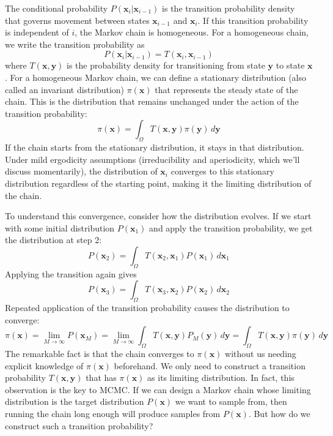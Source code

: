 The conditional probability $P(\mathbf{x}_i|\mathbf{x}_{i-1})$ is the transition probability density that governs movement between states $\mathbf{x}_{i-1}$ and $\mathbf{x}_i$. If this transition probability is independent of $i$, the Markov chain is homogeneous. For a homogeneous chain, we write the transition probability as
\begin{equation}
    P(\mathbf{x}_i|\mathbf{x}_{i-1}) = T(\mathbf{x}_i, \mathbf{x}_{i-1})
\end{equation}
where $T(\mathbf{x}, \mathbf{y})$ is the probability density for transitioning from state $\mathbf{y}$ to state $\mathbf{x}$. For a homogeneous Markov chain, we can define a stationary distribution (also called an invariant distribution) $\pi(\mathbf{x})$ that represents the steady state of the chain. This is the distribution that remains unchanged under the action of the transition probability:
\begin{equation}
    \pi(\mathbf{x}) = \int_{\Omega} T(\mathbf{x}, \mathbf{y}) \pi(\mathbf{y}) \, d\mathbf{y}
\end{equation}
If the chain starts from the stationary distribution, it stays in that distribution. Under mild ergodicity assumptions (irreducibility and aperiodicity, which we'll discuss momentarily), the distribution of $\mathbf{x}_i$ converges to this stationary distribution regardless of the starting point, making it the limiting distribution of the chain.

To understand this convergence, consider how the distribution evolves. If we start with some initial distribution $P(\mathbf{x}_1)$ and apply the transition probability, we get the distribution at step 2:
\begin{equation}
    P(\mathbf{x}_2) = \int_{\Omega} T(\mathbf{x}_2, \mathbf{x}_1) P(\mathbf{x}_1) \, d\mathbf{x}_1
\end{equation}
Applying the transition again gives
\begin{equation}
    P(\mathbf{x}_3) = \int_{\Omega} T(\mathbf{x}_3, \mathbf{x}_2) P(\mathbf{x}_2) \, d\mathbf{x}_2
\end{equation}
Repeated application of the transition probability causes the distribution to converge:
\begin{equation}
    \pi(\mathbf{x}) = \lim_{M \to \infty} P(\mathbf{x}_M) = \lim_{M \to \infty} \int_{\Omega} T(\mathbf{x}, \mathbf{y}) P_M(\mathbf{y}) \, d\mathbf{y} = \int_{\Omega} T(\mathbf{x}, \mathbf{y}) \pi(\mathbf{y}) \, d\mathbf{y}
\end{equation}
The remarkable fact is that the chain converges to $\pi(\mathbf{x})$ without us needing explicit knowledge of $\pi(\mathbf{x})$ beforehand. We only need to construct a transition probability $T(\mathbf{x}, \mathbf{y})$ that has $\pi(\mathbf{x})$ as its limiting distribution. In fact, this observation is the key to MCMC. If we can design a Markov chain whose limiting distribution is the target distribution $P(\mathbf{x})$ we want to sample from, then running the chain long enough will produce samples from $P(\mathbf{x})$. But how do we construct such a transition probability?

